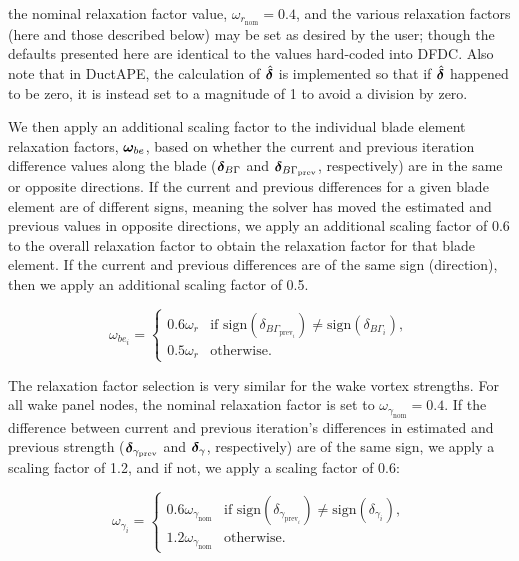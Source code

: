 \where the nominal relaxation factor value, \(\omega_{r_\text{nom}}=0.4\), and the various relaxation factors (here and those described below) may be set as desired by the user; though the defaults presented here are identical to the values hard-coded into DFDC.
%
Also note that in DuctAPE, the calculation of \(\hat{\bm{\delta}}\) is implemented so that if \(\hat{\bm{\delta}}\) happened to be zero, it is instead set to a magnitude of 1 to avoid a division by zero.

We then apply an additional scaling factor to the individual blade element relaxation factors, \(\bm{\omega}_{be}\), based on whether the current and previous iteration difference values along the blade (\(\bm{\delta}_{B\Gamma}\) and \(\bm{\delta}_{B\Gamma_\text{prev}}\), respectively) are in the same or opposite directions.
%
If the current and previous differences for a given blade element are of different signs, meaning the solver has moved the estimated and previous values in opposite directions, we apply an additional scaling factor of 0.6 to the overall relaxation factor to obtain the relaxation factor for that blade element.
%
If the current and previous differences are of the same sign (direction), then we apply an additional scaling factor of 0.5.

\begin{equation}
   \label{eqn:circulationrelaxation}
   \omega_{{be}_i} =
   \begin{cases}
       0.6 \omega_r & \text{if } \text{sign}(\delta_{B\Gamma_{\text{prev}_i}}) \neq \text{sign}(\delta_{B\Gamma_i}), \\
       0.5 \omega_r & \text{otherwise}.
   \end{cases}
\end{equation}

The relaxation factor selection is very similar for the wake vortex strengths.
%
For all wake panel nodes, the nominal relaxation factor is set to \(\omega_{\gamma_\text{nom}} = 0.4\).
%
If the difference between current and previous iteration's differences in estimated and previous strength (\(\bm{\delta}_{\gamma_\text{prev}}\) and \(\bm{\delta}_\gamma\), respectively) are of the same sign, we apply a scaling factor of 1.2, and if not, we apply a scaling factor of 0.6:

\begin{equation}
   \label{eqn:gammathetarelaxation}
   \omega_{\gamma_i} =
   \begin{cases}
       0.6\omega_{\gamma_\text{nom}} &\text{if } \text{sign}(\delta_{\gamma_{\text{prev}_i}}) \neq \text{sign}(\delta_{\gamma_i}), \\
       1.2\omega_{\gamma_\text{nom}} & \text{otherwise}.
   \end{cases}
\end{equation}

